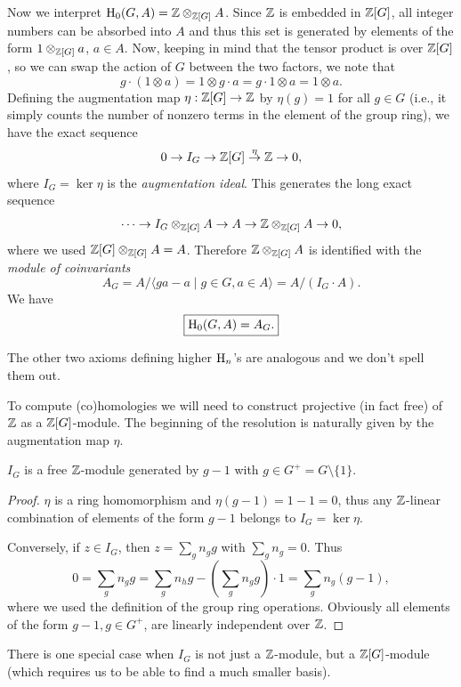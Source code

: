 Now we interpret $\mathrm{H}_0(G,A)=\mathbb{Z}\otimes_{\mathbb{Z}[G]}A$. Since $\mathbb{Z}$ is embedded in $\mathbb{Z}[G]$, all integer numbers can be absorbed into $A$  and thus this set is generated by elements of the form $1\otimes_{\mathbb{Z}[G]} a$, $a\in A$. Now, keeping in mind that the tensor product is over $\mathbb{Z}[G]$, so we can swap the action of $G$ between the two factors, we note that
\[g\cdot (1\otimes a)=1\otimes g\cdot a=g\cdot 1\otimes a=1\otimes a.\]
Defining the augmentation map $\eta:\mathbb{Z}[G]\to \mathbb{Z}$ by $\eta(g)=1$ for all $g\in G$ (i.e., it simply counts the number of nonzero terms in the element of the group ring), we have the exact sequence
\[0\to I_G\to \mathbb{Z}[G]\overset{\eta}{\to} \mathbb{Z}\to 0,\]
where $I_G=\ker \eta$ is the \emph{augmentation ideal}. This generates the long exact sequence
\[\cdots\to I_G\otimes_{\mathbb{Z}[G]}A\to A\to \mathbb{Z}\otimes_{\mathbb{Z}[G]}A\to 0,\]
where we used $\mathbb{Z}[G]\otimes_{\mathbb{Z}[G]}A=A$. Therefore $\mathbb{Z}\otimes_{\mathbb{Z}[G]}A$ is identified with the \emph{module of coinvariants}
\[A_G=A\slash \langle ga-a\mid g\in G,a\in A\rangle=A\slash (I_G\cdot A).\]
We have
\[\boxed{\mathrm{H}_0(G,A)=A_G.}\]

The other two axioms defining higher $\mathrm{H}_n$'s are analogous and we don't spell them out.

To compute (co)homologies we will need to construct projective (in fact free) of $\mathbb{Z}$ as a $\mathbb{Z}[G]$-module. The beginning of the resolution is naturally given by the augmentation map $\eta$.

\begin{thm}
    $I_G$ is a free $\mathbb{Z}$-module generated by $g-1$ with $g\in G^+=G\setminus\{1\}$.
\end{thm}
\begin{proof}
    $\eta$ is a ring homomorphism and $\eta(g-1)=1-1=0$, thus any $\mathbb{Z}$-linear combination of elements of the form $g-1$ belongs to $I_G=\ker \eta$.

    Conversely, if $z\in I_G$, then $z=\sum_g n_g g$ with $\sum_g n_g=0$. Thus 
    \[0=\sum_g n_g g=\sum_g n_hg-\left(\sum_g n_gg\right)\cdot 1=\sum_g n_g(g-1),\]
    where we used the definition of the group ring operations. Obviously all elements of the form $g-1, g\in G^+$, are linearly independent over $\mathbb{Z}$.
\end{proof}

There is one special case when $I_G$ is not just a $\mathbb{Z}$-module, but a $\mathbb{Z}[G]$-module (which requires us to be able to find a much smaller basis).

